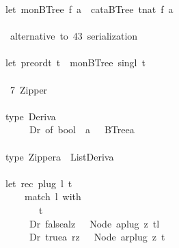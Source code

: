 \documentclass[a4paper]{article}
\begin{document}
\begin{tabbing}
\ttfamily ~let~monBTree~f~a~~cataBTree~tnat~f~a\\
\ttfamily ~\\
\ttfamily ~~alternative~to~43~serialization~\\
\ttfamily ~\\
\ttfamily ~let~preordt~t~~monBTree~singl~t\\
\ttfamily ~\\
\ttfamily ~~7~Zipper~\\
\ttfamily ~\\
\ttfamily ~type~Deriva~~\\
\ttfamily ~~~~~~Dr~of~bool~~a~~~BTreea\\
\ttfamily ~\\
\ttfamily ~type~Zippera~~ListDeriva\\
\ttfamily ~\\
\ttfamily ~let~rec~plug~l~t~\\
\ttfamily ~~~~~match~l~with\\
\ttfamily ~~~~~~~~t\\
\ttfamily ~~~~~~Dr~falsealz~~~Node~aplug~z~tl\\
\ttfamily ~~~~~~Dr~truea~rz~~~Node~arplug~z~t~
\end{tabbing}
\end{document}

